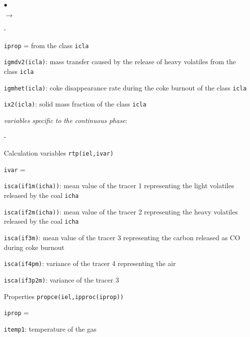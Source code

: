{{\begin{list}{$\bullet$}{}
\begin{list}{$\rightarrow$}{}
\begin{list}{}{}
\begin{list}{-}{}
\begin{list}{\texttt{iprop} = }{}
                            from the class \texttt{icla}
                      \item \texttt{igmdv2(icla)}: mass transfer
                            caused by the release of heavy volatiles
                            from the class \texttt{icla}
                      \item \texttt{igmhet(icla)}: coke
                            disappearance rate during the coke burnout
                            of the class \texttt{icla}
                      \item \texttt{ix2(icla)}: solid mass fraction
                            of the class \texttt{icla}
                     \end{list}
              \end{list}
              \item {\em variables specific to the continuous phase}:
              \begin{list}{-}{}
               \item Calculation variables \texttt{rtp(iel,ivar)}
                     \begin{list}{\texttt{ivar} = }{}
                      \item \texttt{isca(if1m(icha))}: mean value of
                            the tracer 1 representing the light
                            volatiles released by the coal \texttt{icha}
                      \item \texttt{isca(if2m(icha))}: mean value of
                            the tracer 2 representing the heavy
                            volatiles released by the coal \texttt{icha}
                      \item \texttt{isca(if3m)}: mean value of the
                            tracer 3 representing the carbon released as
                            CO during coke burnout
                      \item \texttt{isca(if4pm)}: variance of the
                            tracer 4 representing the air
                      \item \texttt{isca(if3p2m)}: variance of the
                            tracer 3
                     \end{list}
               \item Properties \texttt{propce(iel,ipproc(iprop))}
                     \begin{list}{\texttt{iprop} = }{}
                      \item \texttt{itemp1}: temperature of the gas

\end{list}
\end{list}
\end{list}
\end{list}
\end{list}}}
